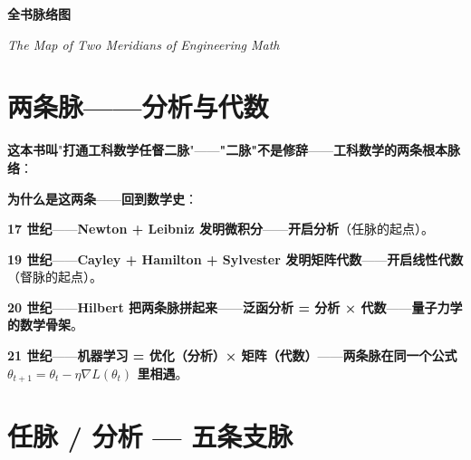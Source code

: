 
\cleardoublepage
\thispagestyle{empty}

\vspace*{1cm}

\begin{center}
{\huge\bfseries 全书脉络图 \par}
\vspace{0.2cm}
{\large\itshape The Map of Two Meridians of Engineering Math \par}
\end{center}

\vspace{0.8cm}

\section*{两条脉——分析与代数}

\textbf{这本书叫}"\textbf{打通工科数学任督二脉}"——\textbf{"二脉"不是修辞}——\textbf{工科数学的两条根本脉络}：

\begin{center}
\end{center}

\vspace{0.5cm}

\textbf{为什么是这两条}——\textbf{回到数学史}：

\textbf{17 世纪}——\textbf{Newton + Leibniz 发明微积分}——\textbf{开启分析}（任脉的起点）。

\textbf{19 世纪}——\textbf{Cayley + Hamilton + Sylvester 发明矩阵代数}——\textbf{开启线性代数}（督脉的起点）。

\textbf{20 世纪}——\textbf{Hilbert 把两条脉拼起来}——\textbf{泛函分析 = 分析 × 代数}——\textbf{量子力学的数学骨架}。

\textbf{21 世纪}——\textbf{机器学习 = 优化（分析）× 矩阵（代数）}——\textbf{两条脉在同一个公式 $\theta_{t+1} = \theta_t - \eta \nabla L(\theta_t)$ 里相遇}。

\section*{任脉 / 分析 — 五条支脉}

